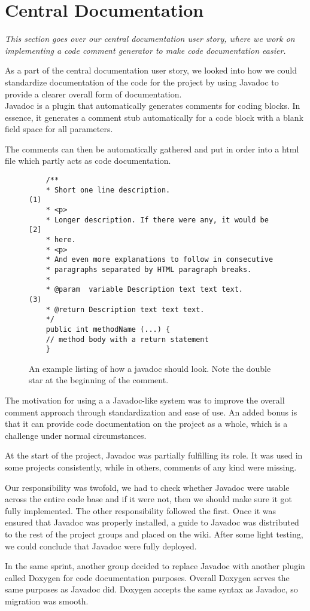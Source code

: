 \section{Central Documentation} \label{Sprint1_SecJavadocs}
\textit{This section goes over our central documentation user story, where we work on implementing a code comment generator to make code documentation easier.}

As a part of the central documentation user story, we looked into how we could standardize documentation of the code for the project by using Javadoc to provide a clearer overall form of documentation.\\
Javadoc is a plugin that automatically generates comments for coding blocks. In essence, it generates a comment stub automatically for a code block with a blank field space for all parameters. \citep{JavadocSource}

The comments can then be automatically gathered and put in order into a html file which partly acts as code documentation.

\begin{figure}[H]
	\begin{lstlisting}
	/**
	* Short one line description.                           (1)
	* <p>
	* Longer description. If there were any, it would be    [2]
	* here.
	* <p>
	* And even more explanations to follow in consecutive
	* paragraphs separated by HTML paragraph breaks.
	*
	* @param  variable Description text text text.          (3)
	* @return Description text text text.
	*/
	public int methodName (...) {
	// method body with a return statement
	}
	\end{lstlisting}
	\caption{An example listing of how a javadoc should look. Note the double star at the beginning of the comment.}
	\label{JavadocExample}
\end{figure}
The motivation for using a a Javadoc-like system was to improve the overall comment approach through standardization and ease of use. An added bonus is that it can provide code documentation on the project as a whole, which is a challenge under normal circumstances.

At the start of the project, Javadoc was partially fulfilling its role. It was used in some projects consistently, while in others, comments of any kind were missing.

Our responsibility was twofold, we had to check whether Javadoc were usable across the entire code base and if it were not, then we should make sure it got fully implemented. The other responsibility followed the first. Once it was ensured that Javadoc was properly installed, a guide to Javadoc was distributed to the rest of the project groups and placed on the wiki. After some light testing, we could conclude that Javadoc were fully deployed.

In the same sprint, another group decided to replace Javadoc with another plugin called Doxygen for code documentation purposes. Overall Doxygen serves the same purposes as Javadoc did.
Doxygen accepts the same syntax as Javadoc, so migration was smooth.
